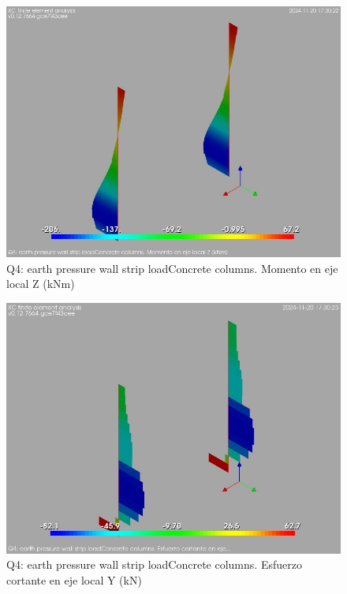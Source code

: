 \begin{figure}[ht]
\begin{center}
\includegraphics[width=\linewidth]{results/graphics/resSimplLC/QearthPWallStrLcolumnZconcrMz.png}
\caption{Q4: earth pressure wall strip loadConcrete columns. Momento en eje local Z (kNm)}
\label{QearthPWallStrLcolumnZconcrMz}
\end{center}
\end{figure}
\begin{figure}[ht]
\begin{center}
\includegraphics[width=\linewidth]{results/graphics/resSimplLC/QearthPWallStrLcolumnZconcrVy.png}
\caption{Q4: earth pressure wall strip loadConcrete columns. Esfuerzo cortante en eje local Y (kN)}
\label{QearthPWallStrLcolumnZconcrVy}
\end{center}
\end{figure}
